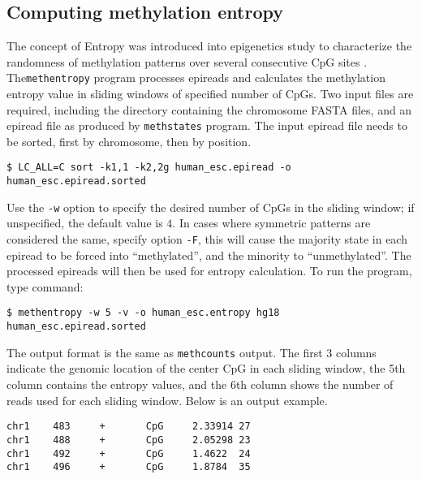 \documentclass[10pt]{article}
\newcommand{\prog}[1]{\texttt{#1}}
\newcommand{\op}[1]{\texttt{#1}}
\begin{document}
{{\subsection{Computing methylation entropy}
\label{sec:methentropy}
The concept of Entropy was introduced into epigenetics study to
characterize the randomness of methylation patterns over several
consecutive CpG sites \cite{xie2011}. The\prog{methentropy} program
processes epireads and calculates the methylation entropy value in
sliding windows of specified number of CpGs. Two input files are
required, including the directory containing the chromosome FASTA
files, and an epiread file as produced by \prog{methstates}
program. The input epiread file needs to be sorted, first by chromosome,
then by position.
\begin{verbatim}
$ LC_ALL=C sort -k1,1 -k2,2g human_esc.epiread -o human_esc.epiread.sorted
\end{verbatim} 

Use the \op{-w} option to specify the desired number of CpGs
in the sliding window; if unspecified, the default value is $4$. In
cases where symmetric patterns are considered the same, specify option
\op{-F}, this will cause the majority state in each epiread to be
forced into ``methylated'', and the minority to ``unmethylated''. The
processed epireads will then be used for entropy calculation. To run
the program, type command:
\begin{verbatim}
$ methentropy -w 5 -v -o human_esc.entropy hg18 human_esc.epiread.sorted
\end{verbatim} 
The output format is the same as \prog{methcounts} output. The first 3
columns indicate the genomic location of the center CpG in each
sliding window, the 5th column contains the entropy values, and the
6th column shows the number of reads used for each sliding
window. Below is an output example.
\begin{verbatim}
chr1    483     +       CpG     2.33914 27
chr1    488     +       CpG     2.05298 23
chr1    492     +       CpG     1.4622  24
chr1    496     +       CpG     1.8784  35
\end{verbatim}


}}
\end{document}
